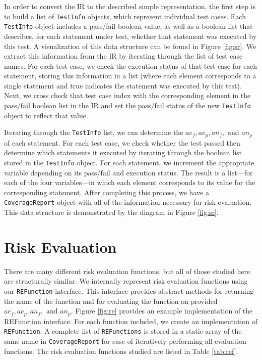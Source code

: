 In order to convert the IR to the described simple representation, the first step is to build
a list of \texttt{TestInfo} objects, which represent individual test cases.  Each \texttt{TestInfo}
object includes a pass/fail boolean value, as well as a boolean list that describes, for each
statement under test, whether that statement was executed by this test.  A visualization of this
data structure can be found in Figure \ref{fig:sr}. We extract this information 
from the IR by iterating through the list of test case names.  For each test case, we check the
execution status of that test case for each statement, storing this information in a list (where
each element corresponds to a single statement and true indicates the statement was executed by this
test).  Next, we cross check that test case index with the corresponding element in the pass/fail
boolean list in the IR and set the pass/fail status of the new \texttt{TestInfo} object to reflect
that value.


Iterating through the \texttt{TestInfo} list, we can determine the $ae_f, ae_p, an_f, \text{ and } an_p$
of each statement.  For each test case, we check whether the test passed then determine which statements
it executed by iterating through the boolean list stored in the \texttt{TestInfo} object.  For each
statement, we increment the appropriate variable depending on its pass/fail and execution status.  The
result is a list---for each of the four variables---in which each element corresponds to its value for
the corresponding statement.  After completing this process, we have a \texttt{CoverageReport} object
with all of the information necessary for risk evaluation.  This data structure is demonstrated by the 
diagram in Figure \ref{fig:sr}.

\section{Risk Evaluation} \label{sec:re}

There are many different risk evaluation functions, but all of those studied here are structurally similar.  We internally
represent risk evaluation functions using our \texttt{REFunction} interface.  This interface provides
abstract methods for returning the name of the function and for evaluating the function on provided
$ae_f, ae_p, an_f, \text{ and } an_p$.  Figure \ref{fig:re} provides an example implementation of
the REFunction interface.  For each function included, we create an implementation of
\texttt{REFunction}.  A complete list of \texttt{REFunctions} is stored in a static array of the
same name in \texttt{CoverageReport} for ease of iteratively performing all evaluation functions.  The
risk evaluation functions studied are listed in Table \ref{tab:ref}.

